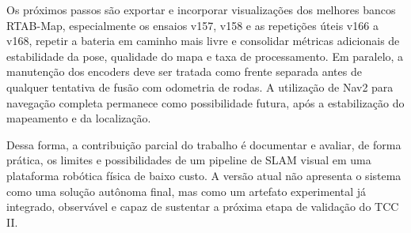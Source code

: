 Os próximos passos são exportar e incorporar visualizações dos melhores bancos RTAB-Map, especialmente os ensaios v157, v158 e as repetições úteis v166 a v168, repetir a bateria em caminho mais livre e consolidar métricas adicionais de estabilidade da pose, qualidade do mapa e taxa de processamento. Em paralelo, a manutenção dos encoders deve ser tratada como frente separada antes de qualquer tentativa de fusão com odometria de rodas. A utilização de Nav2 para navegação completa permanece como possibilidade futura, após a estabilização do mapeamento e da localização.

Dessa forma, a contribuição parcial do trabalho é documentar e avaliar, de forma prática, os limites e possibilidades de um pipeline de SLAM visual em uma plataforma robótica física de baixo custo. A versão atual não apresenta o sistema como uma solução autônoma final, mas como um artefato experimental já integrado, observável e capaz de sustentar a próxima etapa de validação do TCC II.
